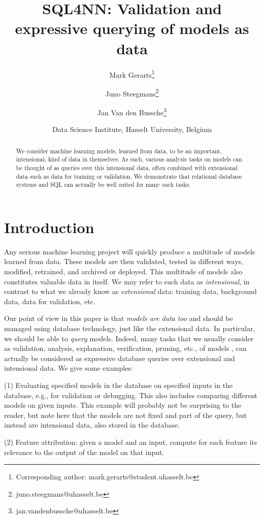 \documentclass{article}
\title{SQL4NN: Validation and expressive querying of models as
data}
\author{Mark Gerarts\thanks{Corresponding
author: mark.gerarts@student.uhasselt.be}
  \and Juno Steegmans\thanks{juno.steegmans@uhasselt.be}
  \and Jan Van den
  Bussche\thanks{jan.vandenbussche@uhasselt.be}}
\date{Data Science Institute, Hasselt University, Belgium}
\begin{document}
\maketitle
\begin{abstract}

We consider machine learning models, learned from data, to be an
  important, intensional, kind of data in themselves.  As such,
  various analysis tasks on models can be thought of as queries
  over this intensional data, often combined with extensional
  data such as data for training or validation.  We demonstrate
  that relational database systems and SQL can actually be well
  suited for many such tasks.

\end{abstract}
\section{Introduction}
Any serious machine learning project will quickly produce a multitude of
models learned from data.  These models are then validated,
tested in different ways, modified, retrained, and archived or deployed.
This multitude of models also constitutes valuable data in
itself.  We may refer to such data as \emph{intensional}, in
contrast to what we already know as \emph{extensional} data: training data,
background data, data for validation, etc.

Our point of view in this paper is that \emph{models are data
too} and should be managed using database technology, just like
the extensional data.  In particular, we should be able to
\emph{query} models.  Indeed, many tasks that we usually consider as 
validation, analysis, explanation, verification, pruning, etc.,
of models
\cite{rudin-stop-explaining,aws-book,LiuALSBK21,molnar-book,pruning101},
can actually be
considered as expressive database queries over extensional and
intensional data.  We give some examples:

(1)    Evaluating specified models in the database on specified
    inputs in the database, e.g., for validation or debugging.
    This also includes comparing different models on given
    inputs.  This example will probably not be surprising to the
    reader, but note here that the models are not fixed and part
    of the query, but instead are intensional data, also stored
    in the database.


(2)    Feature attribution: given a model and an input, compute
    for each feature its relevance to the output of the model on
    that input.
 
\end{document}
